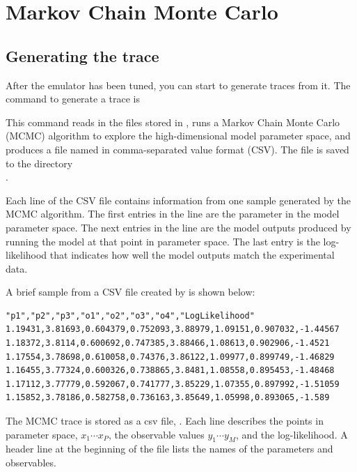 \section{Markov Chain Monte Carlo}\label{sec:mcmc}

\subsection{Generating the trace}

After the emulator has been tuned, you can start to generate traces from it. The command to generate a trace is


This command reads in the files stored in , runs a Markov Chain Monte Carlo (MCMC) algorithm to explore the high-dimensional model parameter space, and produces a file named  in comma-separated value format (CSV). The  file is saved to the directory \\.

Each line of the CSV file contains information from one sample generated by the MCMC algorithm. The first entries in the line are the parameter in the model parameter space. The next entries in the line are the model outputs produced by running the model at that point in parameter space. The last entry is the log-likelihood that indicates how well the model outputs match the experimental data.

A brief sample from a CSV file created by   is shown below:

\begin{verbatim}
"p1","p2","p3","o1","o2","o3","o4","LogLikelihood"
1.19431,3.81693,0.604379,0.752093,3.88979,1.09151,0.907032,-1.44567
1.18372,3.8114,0.600692,0.747385,3.88466,1.08613,0.902906,-1.4521
1.17554,3.78698,0.610058,0.74376,3.86122,1.09977,0.899749,-1.46829
1.16455,3.77324,0.600326,0.738865,3.8481,1.08558,0.895453,-1.48468
1.17112,3.77779,0.592067,0.741777,3.85229,1.07355,0.897992,-1.51059
1.15852,3.78186,0.582758,0.736163,3.85649,1.05998,0.893065,-1.589
\end{verbatim}

The MCMC trace is stored as a csv file, . Each line describes the points in parameter space, $x_1\cdots x_P$, the observable values $y_1\cdots y_M$, and the log-likelihood. A header line at the beginning of the file lists the names of the parameters and observables. 

